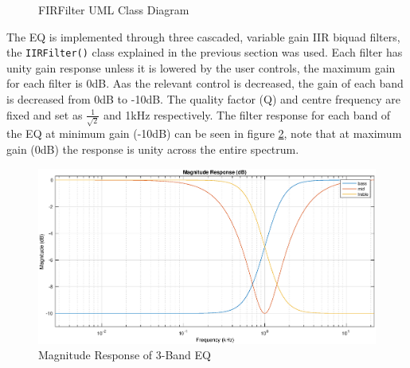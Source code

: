 \documentclass[main.tex]{subfiles}
\begin{document}
\begin{figure}[H]
    \centering
    \caption{FIRFilter UML Class Diagram}
    \label{fig:ClientController-uml}
\end{figure}

\medskip
The EQ is implemented through three cascaded, variable gain IIR biquad filters, the \lstinline{IIRFilter()} class explained in the previous section was used. 
Each filter has unity gain response unless it is lowered by the user controls, the maximum gain for each filter is 0dB.
Aas the relevant control is decreased, the gain of each band is decreased from 0dB to -10dB. 
The quality factor (Q) and centre frequency are fixed and set as $\frac{1}{\sqrt{2}}$ and 1kHz respectively.
The filter response for each band of the EQ at minimum gain (-10dB) can be seen in figure \ref{fig:eq-reponse}, note that at maximum gain (0dB) the response is unity across the entire spectrum.

\begin{centering}
\begin{figure}[H]
    \centering
    \includegraphics[scale=0.6]{./figs/eq-response.eps}        
    \caption{Magnitude Response of 3-Band EQ}
    \label{fig:eq-reponse}
\end{figure}
\end{centering}
\end{document}
